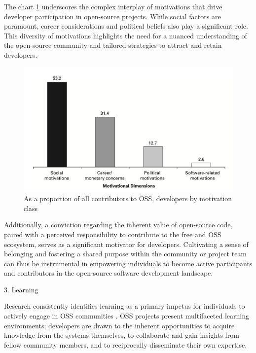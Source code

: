 The chart \ref{fig:motivationDimension} underscores the complex interplay of motivations that drive developer participation in open-source projects. While social factors are paramount, career considerations and political beliefs also play a significant role. This diversity of motivations highlights the need for a nuanced understanding of the open-source community and tailored strategies to attract and retain developers.

\begin{figure}[ht]
    \centering
    \includegraphics[width=0.7\linewidth]{figs/motivationDimension.png}
    \caption{As a proportion of all contributors to OSS, developers by motivation class \cite{ghosh2002free}}
    \label{fig:motivationDimension}
\end{figure}

Additionally,  a conviction regarding the inherent value of open-source code, paired with a perceived responsibility to contribute to the free and OSS ecosystem, serves as a significant motivator for developers. Cultivating a sense of belonging and fostering a shared purpose within the community or project team can thus be instrumental in empowering individuals to become active participants and contributors in the open-source software development landscape.



3. Learning

Research consistently identifies learning as a primary impetus for individuals to actively engage in OSS communities \parencite{06ye2003toward, 07zhao2024openrank, 08zhang2024paid, 09lakhani2005hackers, 10wu2007empirical, 11gerosa2021shifting, 12choi2015characteristics, 17alexander2002working, 18oreg2008exploring}. OSS projects present multifaceted learning environments; developers are drawn to the inherent opportunities to acquire knowledge from the systems themselves, to collaborate and gain insights from fellow community members, and to reciprocally disseminate their own expertise.

